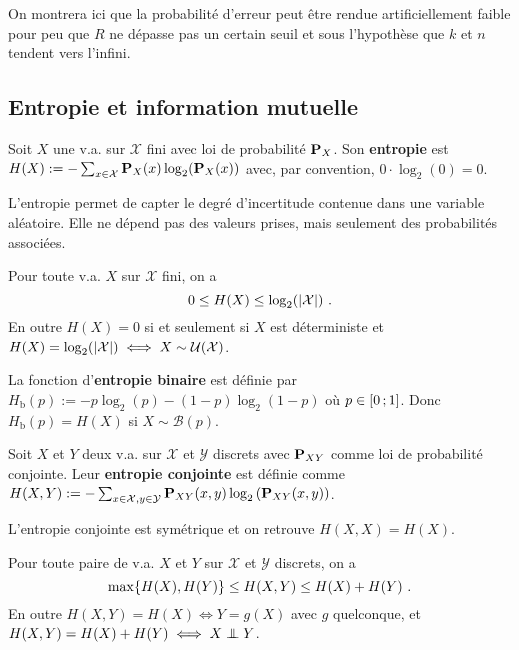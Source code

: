 On montrera ici que la probabilité d'erreur peut être rendue artificiellement faible pour peu que $R$ ne dépasse pas un certain seuil et sous l'hypothèse que $k$ et $n$ tendent vers l'infini.

\subsection{Entropie et information mutuelle}

	\begin{defn}
		Soit $X$ une v.a. sur $\mathcal{X}$ fini avec loi de probabilité $\mathbf{P}_X$.
		Son \textbf{entropie} est $H(X) := - \sum_{x \in \mathcal{X}} \mathbf{P}_X(x) \log_2(\mathbf{P}_X(x))$ avec, par convention, $0 \cdot \log_2(0) = 0$.
	\end{defn}

	L'entropie permet de capter le degré d'incertitude contenue dans une variable aléatoire.
	Elle ne dépend pas des valeurs prises, mais seulement des probabilités associées.

	\begin{thm}
		Pour toute v.a. $X$ sur $\mathcal{X}$ fini, on a
		\vspace{-0.2cm}
		$$0 \leq H(X) \leq \log_2 (\abs{\mathcal{X}})\ .\vspace{-0.2cm}$$
		En outre $H(X) = 0$ si et seulement si $X$ est déterministe et $H(X) = \log_2 (\left\lvert\mathcal{X}\right\rvert) \iff X \sim \mathcal{U}(\mathcal{X})$.
	\end{thm}

	\begin{defn}
		La fonction d'\textbf{entropie binaire} est définie par $H_{\mathrm{b}}(p) := -p \log_2(p) - (1 - p) \log_2(1 - p)$ où $p \in \mathopen{[}0\mathclose{}\mathpunct{};1\mathclose{]}$.
		Donc $H_{\mathrm{b}}(p) = H(X)$ si $X \sim \mathcal{B} \left( p \right)$.
	\end{defn}

	\begin{defn}
		Soit $X$ et $Y$ deux v.a. sur $\mathcal{X}$ et $\mathcal{Y}$ discrets avec $\mathbf{P}_{XY}$ comme loi de probabilité conjointe.
		Leur \textbf{entropie conjointe} est définie comme $H(X,Y) := - \sum_{x \in \mathcal{X}, y \in \mathcal{Y}} \mathbf{P}_{XY}(x,y) \log_2 \left( \mathbf{P}_{XY}(x,y) \right)$.
	\end{defn}

	L'entropie conjointe est symétrique et on retrouve $H(X,X) = H(X)$.

	\begin{thm}
		Pour toute paire de v.a. $X$ et $Y$ sur $\mathcal{X}$ et $\mathcal{Y}$ discrets, on a
		\vspace{-0.2cm}
		$$\max \{ H(X), H(Y) \} \leq H(X,Y) \leq H(X) + H(Y)\ .\vspace{-0.2cm}$$
		En outre $H(X,Y) = H(X) \iff Y = g(X)$ avec $g$ quelconque, et $H(X,Y) = H(X) + H(Y) \iff X \indep Y$.
	\end{thm}

